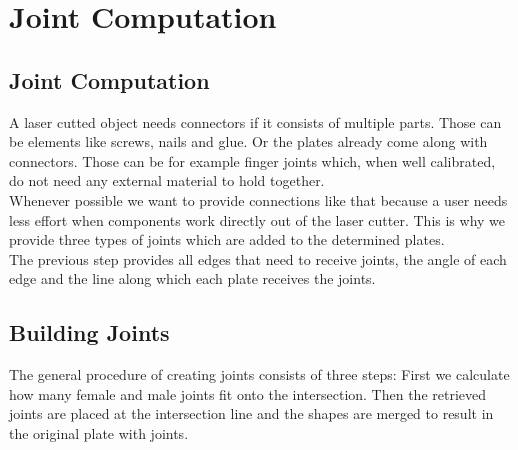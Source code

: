 \documentclass[../ClassicThesis.tex]{subfiles}
\begin{document}
\chapter{Joint Computation}\label{ch:joints}
\newcommand{\TODO}[1]{\textcolor{red}{\\ \textbf{TODO:} #1 \\}}


\section{Joint Computation}
A laser cutted object needs connectors if it consists of multiple parts. Those can be elements like screws, nails and glue. Or the plates already come along with connectors. Those can be for example finger joints which, when well calibrated, do not need any external material to hold together. \\
Whenever possible we want to provide connections like that because a user needs less effort when components work directly out of the laser cutter. This is why we provide three types of joints which are added to the determined plates.\\
The previous  step provides all edges that need to receive joints, the angle of each edge and the line along which each plate receives the joints.

\section{Building Joints}
The general procedure of creating joints consists of three steps: First we calculate how many female and male joints fit onto the intersection. Then the retrieved joints are placed at the intersection line and the shapes are merged to result in the original plate with joints.
\end{document}
